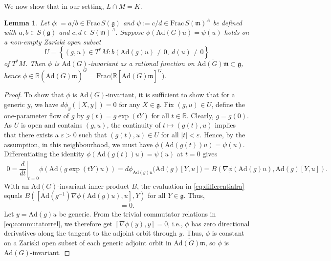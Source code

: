 \documentclass[11pt]{amsart}
\newtheorem{lemma}[theorem]{Lemma}
\theoremstyle{definition}
\theoremstyle{plain}
\theoremstyle{conclusion}
\begin{document}
We now show that in our setting, $L \cap M = K$.

\begin{lemma} \label{lem:orbitconst}
Let $\phi: = a/b\in \mathrm{Frac} \, S(\mathfrak{g})$ and $\psi:= c/d\in \mathrm{Frac} \,S(\mathfrak{m})^A$ be defined with $a,b \in S(\mathfrak{g})$ and $c,d \in S(\mathfrak{m})^A$. Suppose  $\phi(\mathrm{Ad}(G)u)=\psi(u)$  holds on a non-empty Zariski open subset $$U   =\left\{(g,u)\in T^*M : b(\mathrm{Ad}(g)u)\neq 0,\ d(u)\neq 0\right\}$$ of  $T^*M$. Then $\phi$ is $\mathrm{Ad}(G)$-invariant as a rational function on $\overline{\mathrm{Ad}(G)\mathfrak{m}}\subset\mathfrak{g}$, hence $ \phi\in \mathbb{R}(\overline{\mathrm{Ad}(G)\mathfrak{m}})^G =\mathrm{Frac}\big(\mathbb{R}[\overline{\mathrm{Ad}(G)\mathfrak{m}}]^G\big) $.
\end{lemma}

\begin{proof}
To show that $\phi$ is $\mathrm{Ad}(G)$-invariant, it is sufficient to show that for a generic $y$, we have $d\phi_y([X,y]) = 0$ for any $X \in \mathfrak{g}$. Fix $(g,u) \in U$, define the one-parameter flow of $g$ by $g(t)=g \exp(tY)$ for all $t \in \mathbb{R}$. Clearly, $g = g(0)$. As $U$ is open and contains $(g,u)$, the continuity of $t \mapsto (g(t),u)$ implies that there exists a $\varepsilon > 0$ such that $(g(t),u) \in U$ for all $|t| < \varepsilon$. Hence, by the assumption, in this neighbourhood, we must have $\phi(\mathrm{Ad}(g(t))u)=\psi(u)$. Differentiating the identity $\phi(\mathrm{Ad}(g(t))u)=\psi(u)$ at $t=0$ gives
\begin{align}
0 = \left.\dfrac{d}{dt}\right\vert_{t= 0} \phi\left(\mathrm{Ad}(g\exp(tY)u)\right)  =  d\phi_{\mathrm{Ad}(g)u}\big(\mathrm{Ad}(g)[Y,u]\big) = B \left(\nabla \phi(\mathrm{Ad}(g)u),\mathrm{Ad}(g) [Y,u]\right). \label{eq:differentialra}
\end{align} With an $\mathrm{Ad}(G)$-invariant inner product $B$, the evaluation in \eqref{eq:differentialra} equals $ B([\mathrm{Ad}(g^{-1})\nabla\phi(\mathrm{Ad}(g)u),u],Y) $ for all $Y\in\mathfrak{g}$. Thus, \begin{align}
    [\mathrm{Ad}(g^{-1})\nabla\phi(\mathrm{Ad}(g)u),u]=0. \label{eq:commutatorrel}
\end{align}  Let $y=\mathrm{Ad}(g)u$ be generic. From the trivial commutator relations in \eqref{eq:commutatorrel}, we therefore get $[\nabla\phi(y),y]=0$, i.e., $\phi$ has zero directional derivatives along the tangent to the adjoint orbit through $y$. Thus, $\phi$ is constant on a Zariski open subset of each generic adjoint orbit in $\overline{\mathrm{Ad}(G)\mathfrak{m}}$, so $\phi$ is $\mathrm{Ad}(G)$-invariant.
\end{proof}
\end{document}
